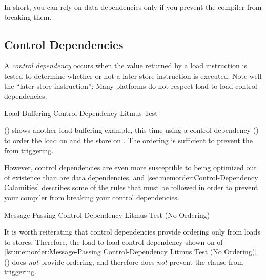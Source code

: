 In short, you can rely on data dependencies only if you prevent the
compiler from breaking them.

\subsection{Control Dependencies}
\label{sec:memorder:Control Dependencies}

A \emph{control dependency} occurs when the value returned by a load
instruction is tested to determine whether or not a later store instruction
is executed.
Note well the ``later store instruction'': Many platforms do not respect
load-to-load control dependencies.

\begin{listing}

\caption{Load-Buffering Control-Dependency Litmus Test}
\label{lst:memorder:Load-Buffering Control-Dependency Litmus Test}
\end{listing}

\begin{fcvref}
()
shows another load-buffering example, this time using a control
dependency () to order the load on  and the store on
.
The ordering is sufficient to prevent the  from triggering.
\end{fcvref}

However, control dependencies are even more susceptible to being optimized
out of existence than are data dependencies, and
\cref{sec:memorder:Control-Dependency Calamities}
describes some of the rules that must be followed in order to prevent
your compiler from breaking your control dependencies.

\begin{listing}

\caption{Message-Passing Control-Dependency Litmus Test (No Ordering)}
\label{lst:memorder:Message-Passing Control-Dependency Litmus Test (No Ordering)}
\end{listing}

\begin{fcvref}
It is worth reiterating that control dependencies provide ordering only
from loads to stores.
Therefore, the load-to-load control dependency shown on  of
\cref{lst:memorder:Message-Passing Control-Dependency Litmus Test (No Ordering)}
()
does \emph{not} provide ordering, and therefore does \emph{not}
prevent the  clause from triggering.
\end{fcvref}

